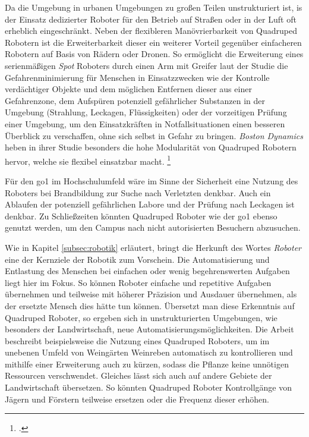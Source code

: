 Da die Umgebung in urbanen Umgebungen zu großen Teilen unstrukturiert ist, is der Einsatz dedizierter Roboter für den
Betrieb auf Straßen oder in der Luft oft erheblich eingeschränkt.
Neben der flexibleren Manövrierbarkeit von Quadruped Robotern ist die Erweiterbarkeit
dieser ein weiterer Vorteil gegenüber einfacheren Robotern auf Basis von Rädern oder Dronen.
So ermöglicht die Erweiterung eines serienmäßigen \emph{Spot} Roboters durch einen Arm mit Greifer laut der Studie
 die Gefahrenminimierung für Menschen in Einsatzzwecken wie der Kontrolle verdächtiger Objekte und dem
möglichen Entfernen dieser aus einer Gefahrenzone, dem Aufspüren potenziell gefährlicher Substanzen in der Umgebung (Strahlung, Leckagen, Flüssigkeiten)
oder der vorzeitigen Prüfung einer Umgebung, um den Einsatzkräften in Notfallsituationen einen besseren Überblick zu verschaffen,
ohne sich selbst in Gefahr zu bringen.
\emph{Boston Dynamics} heben in ihrer Studie besonders die hohe Modularität von Quadruped Robotern hervor, welche sie
flexibel einsatzbar macht.
\footcite{boston_dynamics_safety}

Für den \gls{go1} im Hochschulumfeld wäre im Sinne der Sicherheit eine Nutzung des Roboters bei Brandbildung zur Suche nach Verletzten denkbar.
Auch ein Ablaufen der potenziell gefährlichen Labore und der Prüfung nach Leckagen ist denkbar.
Zu Schließzeiten könnten Quadruped Roboter wie der \gls{go1} ebenso genutzt werden, um den Campus nach nicht autorisierten
Besuchern abzusuchen.


Wie in Kapitel \ref{subsec:robotik} erläutert, bringt die Herkunft des Wortes \emph{Roboter} eine der Kernziele der Robotik zum Vorschein.
Die Automatisierung und Entlastung des Menschen bei einfachen oder wenig begehrenswerten Aufgaben liegt hier im Fokus.
So können Roboter einfache und repetitive Aufgaben übernehmen und teilweise mit höherer Präzision und Ausdauer übernehmen,
als der ersetzte Mensch dies hätte tun können.
Übersetzt man diese Erkenntnis auf Quadruped Roboter, so ergeben sich in unstrukturierten Umgebungen, wie besonders der Landwirtschaft,
neue Automatisierungsmöglichkeiten.
Die Arbeit  beschreibt beispielsweise die Nutzung eines Quadruped Roboters, um im unebenen Umfeld
von Weingärten Weinreben automatisch zu kontrollieren und mithilfe einer Erweiterung auch zu kürzen, sodass die Pflanze
keine unnötigen Ressourcen verschwendet.
Gleiches lässt sich auch auf andere Gebiete der Landwirtschaft übersetzen.
So könnten Quadruped Roboter Kontrollgänge von Jägern und Förstern teilweise ersetzen oder die Frequenz dieser erhöhen.

